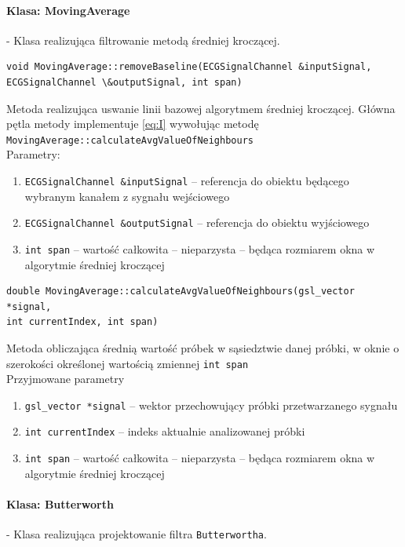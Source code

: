 \documentclass[a4paper, 11pt]{article}
\begin{document}
\paragraph{Klasa: MovingAverage}
- Klasa realizująca filtrowanie metodą średniej kroczącej.

\begin{lstlisting}
void MovingAverage::removeBaseline(ECGSignalChannel &inputSignal, 
ECGSignalChannel \&outputSignal, int span)
\end{lstlisting}
Metoda realizująca uswanie linii bazowej algorytmem średniej kroczącej. Główna pętla metody implementuje \eqref{eq:I} wywołując metodę \verb|MovingAverage::calculateAvgValueOfNeighbours|\\

Parametry:
\begin{enumerate}
\item \verb|ECGSignalChannel &inputSignal|  -- referencja do obiektu będącego wybranym kanałem z sygnału wejściowego
\item \verb|ECGSignalChannel &outputSignal|  -- referencja do obiektu wyjściowego
\item \verb|int span|  -- wartość całkowita  -- nieparzysta  -- będąca rozmiarem okna w algorytmie średniej kroczącej
\end{enumerate}

\begin{lstlisting}
double MovingAverage::calculateAvgValueOfNeighbours(gsl_vector *signal, 
int currentIndex, int span)
\end{lstlisting}
Metoda obliczająca średnią wartość próbek w sąsiedztwie danej próbki, w oknie o szerokości określonej wartością zmiennej \verb|int span|\\

Przyjmowane parametry
\begin{enumerate}
\item \verb|gsl_vector *signal|  -- wektor przechowujący próbki przetwarzanego sygnału
\item \verb|int currentIndex|  -- indeks aktualnie analizowanej próbki
\item \verb|int span|  -- wartość całkowita  -- nieparzysta  -- będąca rozmiarem okna w algorytmie średniej kroczącej
\end{enumerate}

\paragraph{Klasa: Butterworth}
- Klasa realizująca projektowanie filtra \verb|Butterwortha|.
\end{document}
